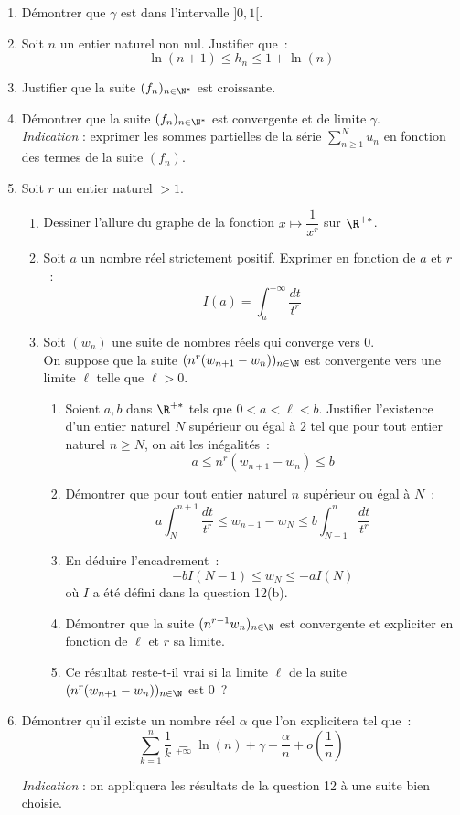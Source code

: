 \documentclass[twoside,french,11pt]{VcCours}
\begin{document}
\begin{enumerate}[resume]
\item Démontrer que $\gamma$ est dans l'intervalle $]0,1[$.
\item Soit $n$ un entier naturel non nul. Justifier que~:
\[\ln(n+1)\leq h_n\leq 1+\ln(n)\]
\item Justifier que la suite $(f_n)_{n\in \N^*}$ est croissante.
\item Démontrer que la suite $(f_n)_{n\in \N^*}$ est convergente et de limite $\gamma$.\\
\textit{Indication} : exprimer les sommes partielles de la série $\sum\limits_{n\geq 1}^Nu_n$ en fonction des termes de la suite $(f_n)$.
\item Soit $r$ un entier naturel $>1$.
\begin{enumerate}
\item Dessiner l'allure du graphe de la fonction $x\mapsto \dfrac{1}{x^r}$ sur $\R^{+*}$.
\item Soit $a$ un nombre réel strictement positif. Exprimer en fonction de $a$ et $r$~:
\[I(a)=\int_a^{+\infty}\frac{dt}{t^r}\]
\item Soit $(w_n)$ une suite de nombres réels qui converge vers $0$.\\
On suppose que la suite $(n^r(w_{n+1}-w_n))_{n\in \N}$ est convergente vers une limite $\ell$ telle que $\ell >0$.
\begin{enumerate}
\item Soient $a,b$ dans $\R^{+*}$ tels que $0<a<\ell<b$. Justifier l'existence d'un entier naturel $N$ supérieur ou égal à $2$ tel que pour tout entier naturel $n\geq N$, on ait les inégalités~:
\[a\leq n^r(w_{n+1}-w_n)\leq b\]
\item Démontrer que pour tout entier naturel $n$ supérieur ou égal à $N$~:
\[a\int_{N}^{n+1}\frac{dt}{t^r}\leq w_{n+1}-w_N\leq b\int_{N-1}^n\frac{dt}{t^r}\]
\item En déduire l'encadrement~:
\[-bI(N-1)\leq w_N\leq -aI(N)\]
o\`u $I$ a été défini dans la question 12(b).
\item Démontrer que la suite $(n^{r-1}w_n)_{n\in \N}$ est convergente et expliciter en fonction de $\ell$ et $r$ sa limite.
\item Ce résultat reste-t-il vrai si la limite $\ell$ de la suite $(n^{r}(w_{n+1}-w_n))_{n\in \N}$ est $0$~?
\end{enumerate} 
\end{enumerate}
\item Démontrer qu'il existe un nombre réel $\alpha$ que l'on explicitera tel que~:
\[ \sum_{k=1}^n\frac{1}{k} \underset{+ \infty}{=}\ln(n)+\gamma+\frac{\alpha}{n}+o \left(\frac{1}{n} \right)\]

\noindent \textit{Indication} : on appliquera les résultats de la question 12 à une suite bien choisie.
\end{enumerate}
  
\end{document}

